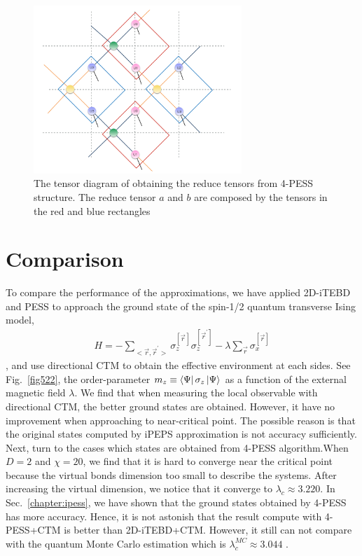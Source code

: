 \begin{figure}[ht]
	\centering
	\includegraphics[width=0.70\textwidth]{figures/fig521.png}
	\caption[The tensor diagram of obtaining the reduce tensors from 4-PESS structure.]{The tensor diagram of obtaining the reduce tensors from 4-PESS structure. The reduce tensor $a$ and $b$ are composed by the tensors in the red and blue rectangles}
	\label{fig521}
\end{figure}

\section{Comparison}

To compare the performance of the approximations, we have applied 2D-iTEBD and PESS to approach the ground state of the spin-1/2 quantum transverse Ising model, 
\begin{align}
	H = -\sum_{<\vec{r},\vec{r}^{\prime}>}{\sigma_z^{[ \vec{r}^{} ]} \sigma_z^{[ \vec{r}^{\prime} ]}} - \lambda \sum_{\vec{r}}{\sigma_x^{[ \vec{r} ]}}
\end{align}
, and use directional CTM to obtain the effective environment at each sides. See Fig.~\ref{fig522}, the order-parameter $m_z \equiv  \Bra{\Psi} \sigma_z \Ket{\Psi}$ as a function of the external magnetic field $\lambda$. We find that when measuring the local observable with directional CTM, the better ground states are obtained. However, it have no improvement when approaching to near-critical point. The possible reason is that 
the original states computed by iPEPS approximation is not accuracy sufficiently. Next, turn to the cases which states are obtained from 4-PESS algorithm.When $D=2$ and $\chi = 20$, we find that it is hard to converge near the critical point because the virtual bonds dimension too small to describe the systems. After increasing the virtual dimension, we notice that it converge to $\lambda_c \approx 3.220$. In Sec.~\ref{chapter:ipess}, we have shown that the ground states obtained by 4-PESS has more accuracy. Hence, it is not astonish that the result compute with 4-PESS+CTM is better than 2D-iTEBD+CTM. However, it still can not compare with  the quantum Monte Carlo estimation which is $\lambda^{MC}_c \approx 3.044$ \cite{PhysRevE.66.066110}.

